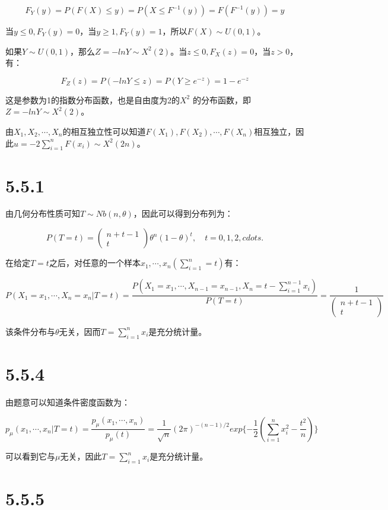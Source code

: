 \documentclass{article}
\begin{document}
$$F_Y(y)=P(F(X)\leq y)=P(X\leq F^{-1}(y))=F(F^{-1}(y))=y$$

当$y\leq 0,F_Y(y)=0$，当$y\geq 1,F_Y(y)=1$，所以$F(X)\sim U(0,1)$。

如果$Y\sim U(0,1)$，那么$Z=-lnY\sim X^2(2)$。当$z\leq 0,F_X(z)=0$，当$z>0$，有：

$$F_Z(z)=P(-lnY\leq z)=P(Y\geq e^{-z})=1-e^{-z}$$

这是参数为1的指数分布函数，也是自由度为2的$X^2$
的分布函数，即$Z=-lnY\sim X^2(2)$。

由$X_1,X_2,\cdots,X_n$的相互独立性可以知道$F(X_1),F(X_2),\cdots,F(X_n)$相互独立，因此$u=-2\sum^n_{i=1}F(x_i)\sim X^2(2n)$。


\section{5.5.1}
由几何分布性质可知$T\sim Nb(n,\theta)$，因此可以得到分布列为：

\begin{equation}
P(T=t)=
\begin{pmatrix}
n+t-1\\
t
\end{pmatrix}
\theta^n(1-\theta)^t,\quad t=0,1,2,cdots.
\end{equation}

在给定$T=t$之后，对任意的一个样本$x_1,\cdots,x_n(\sum^n_{i=1}=t)$有：


\begin{equation}
P(X_1=x_1,\cdots,X_n=x_n|T=t)=\frac{P(X_1=x_1,\cdots,X_{n-1}=x_{n-1},X_n=t-\sum^{n-1}_{i=1}x_i)}{P(T=t)}
= \frac{1}{\begin{pmatrix}
n+t-1\\
t
\end{pmatrix}}
\end{equation}

该条件分布与$\theta$无关，因而$T=\sum^n_{i=1}x_i$是充分统计量。

\section{5.5.4}
由题意可以知道条件密度函数为：

$$p_\mu(x_1,\cdots,x_n|T=t)=\frac{p_\mu(x_1,\cdots,x_n)}{p_\mu(t)}=\frac{1}{\sqrt{n}}(2\pi)^{-(n-1)/2}exp\{-\frac12(\sum^n_{i=1}x_i^2-\frac{t^2}{n})\}$$

可以看到它与$\mu$无关，因此$T=\sum^n_{i=1}x_i$是充分统计量。


\section{5.5.5}
\end{document}
